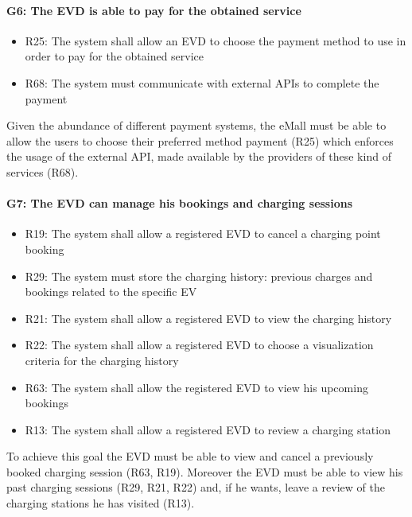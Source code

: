 \clearpage
\paragraph{G6: The EVD is able to pay for the obtained service}
\begin{itemize}
    \item R25: The system shall allow an EVD to choose the payment method to use in order to pay for the obtained service
    \item R68: The system must communicate with external APIs to complete the payment
\end{itemize}
Given the abundance of different payment systems, the eMall must be able to allow the users to choose their preferred method payment (R25) which enforces the usage of the external API, made available by the providers of these kind of services (R68).
\paragraph{G7: The EVD can manage his bookings and charging sessions}
\begin{itemize}
    \item R19: The system shall allow a registered EVD to cancel a charging point booking
    \item R29: The system must store the charging history: previous charges and bookings related to the specific EV
    \item R21: The system shall allow a registered EVD to view the charging history 
    \item R22: The system shall allow a registered EVD to choose a visualization criteria for the charging history
    \item R63: The system shall allow the registered EVD to view his upcoming bookings
    \item R13: The system shall allow a registered EVD to review a charging station 
\end{itemize}
To achieve this goal the EVD must be able to view and cancel a previously booked charging session (R63, R19). Moreover the EVD must be able to view his past charging sessions (R29, R21, R22) and, if he wants, leave a review of the charging stations he has visited (R13).

